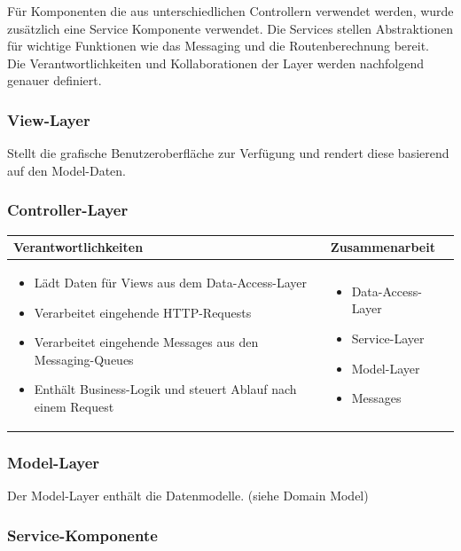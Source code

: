 Für Komponenten die aus unterschiedlichen Controllern verwendet werden, wurde zusätzlich eine Service Komponente verwendet. Die Services stellen Abstraktionen für wichtige Funktionen wie das Messaging und die Routenberechnung bereit.\\

Die Verantwortlichkeiten und Kollaborationen der Layer werden nachfolgend genauer definiert.

\subsubsection{View-Layer}
Stellt die grafische Benutzeroberfläche zur Verfügung und rendert diese basierend auf den Model-Daten.

\subsubsection{Controller-Layer}
\begin{tabular}{|p{}|p{}|} \hline
	\textbf{Verantwortlichkeiten} & \textbf{Zusammenarbeit} \\ \hline \hline
	\begin{itemize}
		\item Lädt Daten für Views aus dem Data-Access-Layer
		\item Verarbeitet eingehende HTTP-Requests
		\item Verarbeitet eingehende Messages aus den Messaging-Queues
		\item Enthält Business-Logik und steuert Ablauf nach einem Request	
	\end{itemize}&
	\begin{itemize}
		\item Data-Access-Layer
		\item Service-Layer
		\item Model-Layer
		\item Messages
	\end{itemize}
	\\ \hline
\end{tabular}

\subsubsection{Model-Layer}

Der Model-Layer enthält die Datenmodelle. (siehe Domain Model)

\subsubsection{Service-Komponente}

